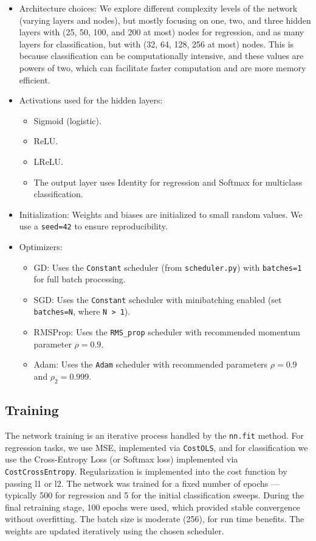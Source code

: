 \documentclass[amssymb,twocolumn,aps,floatfix]{revtex4-2}
\begin{document}
\begin{itemize}
    \item Architecture choices: We explore different complexity levels of the network (varying layers and nodes), but mostly focusing on one, two, and three hidden layers with (25, 50, 100, and 200 at most) nodes for regression, and as many layers for classification, but with (32, 64, 128, 256 at most) nodes. This is because classification can be computationally intensive, and these values are powers of two, which can facilitate faster computation and are more memory efficient. 
    \item Activations used for the hidden layers: 
    \begin{itemize}
        \item Sigmoid (logistic).
        \item ReLU.
        \item LReLU.
        \item The output layer uses Identity for regression and Softmax for multiclass classification.
    \end{itemize}
    \item Initialization: Weights and biases are initialized to small random values. We use a \texttt{seed=42} to ensure reproducibility.
    \item Optimizers: 
    \begin{itemize}
        \item GD: Uses the \texttt{Constant} scheduler (from \texttt{scheduler.py}) with \texttt{batches=1} for full batch processing. 
        \item SGD: Uses the \texttt{Constant} scheduler with minibatching enabled (set \texttt{batches=N}, where \texttt{N > 1}). 
        \item RMSProp: Uses the \texttt{RMS\_prop} scheduler with recommended momentum parameter $\rho = 0.9$. 
        \item Adam: Uses the \texttt{Adam} scheduler with recommended parameters $\rho = 0.9$ and $\rho_2 = 0.999$. 
    \end{itemize}
\end{itemize}


\subsection{Training}

The network training is an iterative process handled by the \texttt{nn.fit} method. For regression tasks, we use MSE, implemented via \texttt{CostOLS}, and for classification we use the Cross-Entropy Loss (or Softmax loss) implemented via \texttt{CostCrossEntropy}. Regularization is implemented into the cost function by passing l1 or l2. The network was trained for a fixed number of epochs — typically 500 for regression and 5 for the initial classification sweeps. During the final retraining stage, 100 epochs were used, which provided stable convergence without overfitting. The batch size is moderate (256), for run time benefits. The weights are updated iteratively using the chosen scheduler. 
\end{document}
